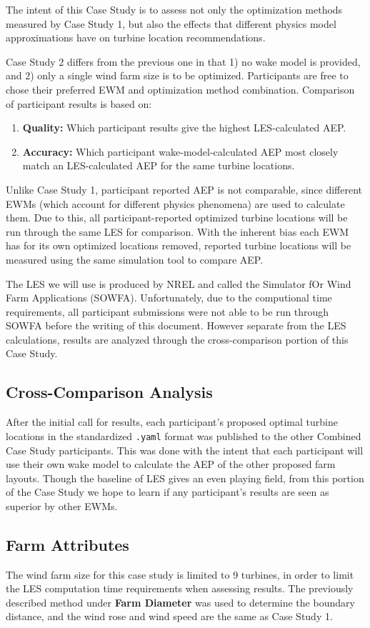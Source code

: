 The intent of this Case Study is to assess not only the optimization methods measured by Case Study 1, but also the effects that different physics model approximations have on turbine location recommendations.

Case Study 2 differs from the previous one in that 1) no wake model is provided, and 2) only a single wind farm size is to be optimized.
Participants are free to chose their preferred EWM and optimization method combination.
Comparison of participant results is based on:
\begin{enumerate}
	\item \textbf{Quality:} Which participant results give the highest LES-calculated AEP.
	\item \textbf{Accuracy:} Which participant wake-model-calculated AEP most closely match an LES-calculated AEP for the same turbine locations.
\end{enumerate}

Unlike Case Study 1, participant reported AEP is not comparable, since different EWMs (which account for different physics phenomena) are used to calculate them.
Due to this, all participant-reported optimized turbine locations will be run through the same LES for comparison.
With the inherent bias each EWM has for its own optimized locations removed, reported turbine locations will be measured using the same simulation tool to compare AEP.

The LES we will use is produced by NREL and called the Simulator fOr Wind Farm Applications (SOWFA).
Unfortunately, due to the computional time requirements, all participant submissions were not able to be run through SOWFA before the writing of this document.
However separate from the LES calculations, results are analyzed through the cross-comparison portion of this Case Study.

\subsection{Cross-Comparison Analysis}
After the initial call for results, each participant's proposed optimal turbine locations in the standardized \texttt{.yaml} format was published to the other Combined Case Study participants.
This was done with the intent that each participant will use their own wake model to calculate the AEP of the other proposed farm layouts.
Though the baseline of LES gives an even playing field, from this portion of the Case Study we hope to learn if any participant's results are seen as superior by other EWMs.

\subsection{Farm Attributes}
The wind farm size for this case study is limited to 9 turbines, in order to limit the LES computation time requirements when assessing results.
The previously described method under \textbf{Farm Diameter} was used to determine the boundary distance, and the wind rose and wind speed are the same as Case Study 1.